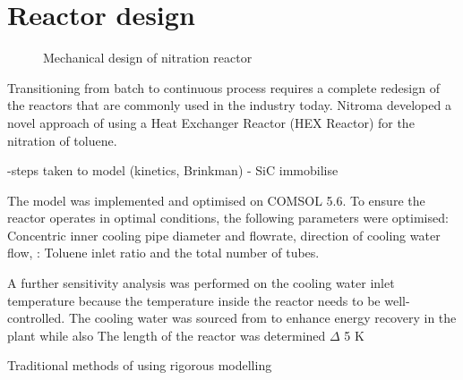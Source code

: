 \section*{Reactor design}
\begin{figure}[h]
    \centering
    \caption{Mechanical design of nitration reactor}
    \label{fig:comsol-S4-CW-X-T}
\end{figure}

Transitioning from batch to continuous process requires a complete redesign of the reactors that are commonly used in the industry today. Nitroma developed a novel approach of using a Heat Exchanger Reactor (HEX Reactor) for the nitration of toluene.

-steps taken to model (kinetics, Brinkman) 
- SiC immobilise

The model was implemented and optimised on COMSOL 5.6. To ensure the reactor operates in optimal conditions, the following parameters were optimised: Concentric inner cooling pipe diameter and flowrate, direction of cooling water flow,  : Toluene inlet ratio and the total number of tubes.

A further sensitivity analysis was performed on the cooling water inlet temperature because the temperature inside the reactor needs to be well-controlled. The cooling water was sourced from to enhance energy recovery in the plant while also The length of the reactor was determined \mypm $\Delta$ 5 K

Traditional methods of using 
rigorous modelling


